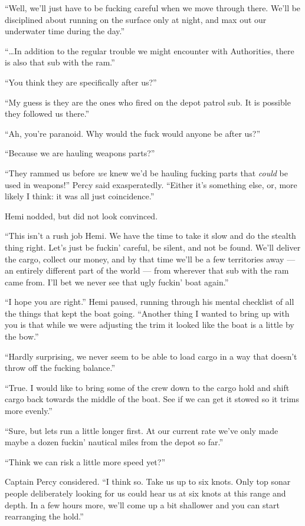 \documentclass[
]{scrbook}
\begin{document}
``Well, we'll just have to be fucking careful when we move through
there. We'll be disciplined about running on the surface only at night,
and max out our underwater time during the day.''

``\ldots In addition to the regular trouble we might encounter with
Authorities, there is also that sub with the ram.''

``You think they are specifically after us?''

``My guess is they are the ones who fired on the depot patrol sub. It is
possible they followed us there.''

``Ah, you're paranoid. Why would the fuck would anyone be after us?''

``Because we are hauling weapons parts?''

``They rammed us before \emph{we} knew we'd be hauling fucking parts
that \emph{could} be used in weapons!'' Percy said exasperatedly.
``Either it's something else, or, more likely I think: it was all just
coincidence.''

Hemi nodded, but did not look convinced.

``This isn't a rush job Hemi. We have the time to take it slow and do
the stealth thing right. Let's just be fuckin' careful, be silent, and
not be found. We'll deliver the cargo, collect our money, and by that
time we'll be a few territories away --- an entirely different part of
the world --- from wherever that sub with the ram came from. I'll bet we
never see that ugly fuckin' boat again.''

``I hope you are right.'' Hemi paused, running through his mental
checklist of all the things that kept the boat going. ``Another thing I
wanted to bring up with you is that while we were adjusting the trim it
looked like the boat is a little by the bow.''

``Hardly surprising, we never seem to be able to load cargo in a way
that doesn't throw off the fucking balance.''

``True. I would like to bring some of the crew down to the cargo hold
and shift cargo back towards the middle of the boat. See if we can get
it stowed so it trims more evenly.''

``Sure, but lets run a little longer first. At our current rate we've
only made maybe a dozen fuckin' nautical miles from the depot so far.''

``Think we can risk a little more speed yet?''

Captain Percy considered. ``I think so. Take us up to six knots. Only
top sonar people deliberately looking for us could hear us at six knots
at this range and depth. In a few hours more, we'll come up a bit
shallower and you can start rearranging the hold.''
\end{document}
